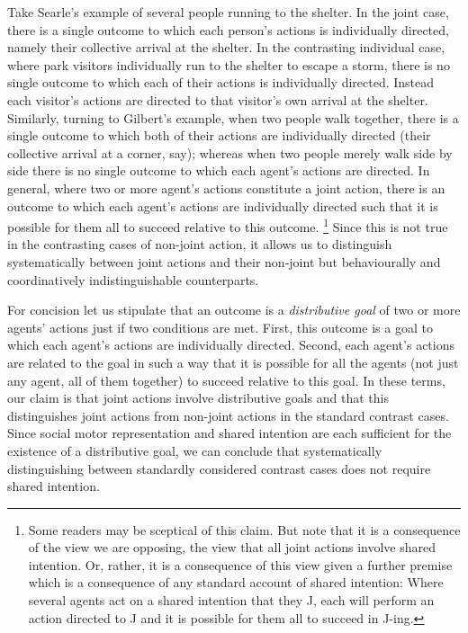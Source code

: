 \documentclass[12pt,\papersize]{extarticle}
\begin{document}
Take Searle's example of several people running to the shelter.  
In the joint case, there is a single outcome to which each person's actions is individually directed, namely their collective arrival at the shelter.  
In the contrasting individual case, where park visitors individually run to the shelter to escape a storm, there is no single outcome to which each of their actions is individually directed.  
Instead each visitor's actions are directed to that visitor's own arrival at the shelter.  
Similarly, turning to Gilbert's example, when two people walk together, there is a single outcome to which both of their actions are individually directed (their collective arrival at a corner, say); whereas when two people merely walk side by side there is no single outcome to which each agent's actions are directed.  
In general, where two or more agent's actions constitute a joint action, there is an outcome to which each agent's actions are individually directed such that it is possible for them all to succeed relative to this outcome.%
\footnote{
Some readers may be sceptical of this claim.
But note that it is a consequence of the view we are opposing, the view that all joint actions involve shared intention.
Or, rather, it is a consequence of this view given a further premise which is a consequence of any standard account of shared intention: Where several agents act on a shared intention that they J, 
each will perform an action directed to J and it is possible for them all to succeed in J-ing.
} 
Since this is not true in the contrasting cases of non-joint action, it allows us to distinguish systematically between joint actions and their non-joint but behaviourally and coordinatively indistinguishable counterparts.  

For concision let us stipulate that an outcome is a \emph{distributive goal} of two or more agents' actions just if two conditions are met.
First, this outcome is a goal to which each agent's actions are individually directed.
Second, each agent's actions are related to the goal in such a way that it is possible for all the agents (not just any agent, all of them together) to succeed relative to this goal.
In these terms, our claim is that joint actions involve distributive goals and that this distinguishes joint actions from non-joint actions in the standard contrast cases.  
Since social motor representation and shared intention are each sufficient for the existence of a distributive goal, we can conclude that systematically distinguishing between standardly considered contrast cases does not require shared intention.
 
\end{document}
